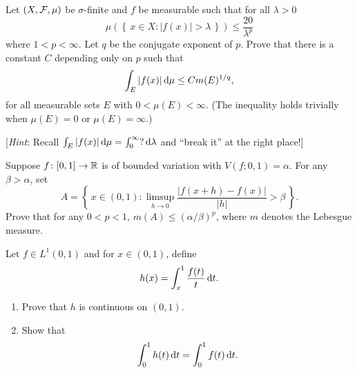 \begin{problem}
  Let $(X,\mathcal{F},\mu)$ be $\sigma$-finite and $f$ be measurable such that
  for all $\lambda>0$
  \[
    \mu\left( \left\{ \,x\in X:|f(x)|>\lambda\, \right\} \right)\leq%
    \frac{20}{\lambda^p}
  \]
  where $1<p<\infty$. Let $q$ be the conjugate exponent of $p$. Prove that
  there is a constant $C$ depending only on $p$ such that
  \[
    \int_E |f(x)|\mathop{}\!\mathrm{d}\mu\leq Cm(E)^{1/q},
  \]
  for all measurable sets $E$ with $0<\mu(E)<\infty$. (The inequality holds
  trivially when $\mu(E)=0$ or $\mu(E)=\infty$.)

  [\emph{Hint}: Recall $\int_E |f(x)|\mathop{}\!\mathrm{d}\mu=\int_0^\infty?\mathop{}\!\mathrm{d}\lambda$
  and ``break it'' at the right place!]
\end{problem}
\begin{solution}
\end{solution}

\begin{problem}
  Suppose $f\colon[0,1]\to\mathbb{R}$ is of bounded variation with
  $V(f;0,1)=\alpha$. For any $\beta>\alpha$, set
  \[
    A=\left\{\,x\in(0,1):\limsup_{h\to 0}\frac{|f(x+h)-f(x)|}{|h|}>\beta\,\right\}.
  \]
  Prove that for any $0<p<1$,  $m(A)\leq (\alpha/\beta)^p$, where $m$
  denotes the Lebesgue measure.
\end{problem}
\begin{solution}
\end{solution}

\begin{problem}
  Let $f\in L^1(0,1)$ and for $x\in(0,1)$, define
  \[
    h(x)=\int_x^1\frac{f(t)}{t}\mathop{}\!\mathrm{d} t.
  \]
  \begin{enumerate}[label=(\roman*),noitemsep]
  \item Prove that $h$ is continuous on $(0,1)$.
  \item Show that
    \[
      \int_0^1 h(t)\mathop{}\!\mathrm{d} t=\int_0^1 f(t)\mathop{}\!\mathrm{d} t.
    \]
  \end{enumerate}
\end{problem}
\begin{solution}
\end{solution}

